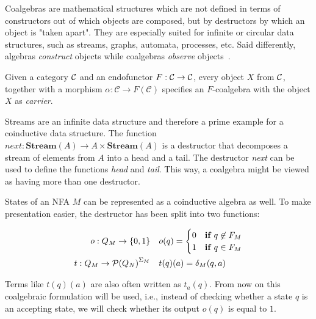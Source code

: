 Coalgebras are mathematical structures which are not defined in terms of constructors
out of which objects are composed, but by destructors by which an object is "taken apart".
They are especially suited for infinite or circular data structures,
such as streams, graphs, automata, processes, etc.
Said differently, algebras \textit{construct} objects
while coalgebras \textit{observe} objects~\cite{Jacobs97atutorial}.

\begin{definition}
    Given a category $\mathcal{C}$ and an endofunctor $F : \mathcal{C} \rightarrow \mathcal{C}$,
    every object $X$ from $\mathcal{C}$, together with a morphism
    $\alpha : \mathcal{C} \rightarrow F(\mathcal{C})$
    specifies an $F$-coalgebra with the object $X$ as \textit{carrier}.
\end{definition}

\begin{example}
    Streams are an infinite data structure and therefore
    a prime example for a coinductive data structure.
    The function
    $\textit{next} : \textbf{Stream}(A) \rightarrow A \times \textbf{Stream}(A)$
    is a destructor that decomposes a stream of elements from $A$ into a head and a tail.
    The destructor \textit{next} can be used to define the functions \textit{head} and \textit{tail}.
    This way, a coalgebra might be viewed as having more than one destructor.
\end{example}

\begin{example}
    States of an NFA $M$ can be represented as a coinductive algebra as well.
    To make presentation easier, the destructor has been split into two functions:

    \begin{align}
        o: Q_M \rightarrow \{0, 1\}\quad &o(q) =
            \begin{cases}
                0 & \textbf{if } q \not\in F_M\\
                1 & \textbf{if } q \in F_M
            \end{cases}\\
        t: Q_M \rightarrow {\mathcal{P}(Q_N)} ^{\Sigma_M} \quad & t(q)(a) = \delta_M(q, a)
    \end{align}

    Terms like $t(q)(a)$ are also often written as $t_a(q)$.
    From now on this coalgebraic formulation will be used, i.e.,
    instead of checking whether a state $q$ is an accepting state,
    we will check whether its output $o(q)$ is equal to $1$.
\end{example}

